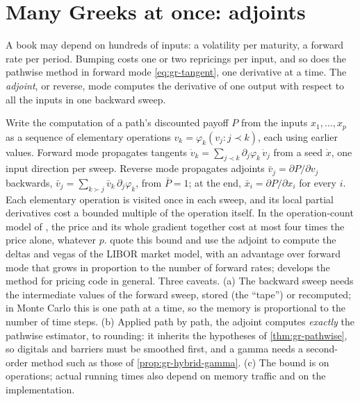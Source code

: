 
\section{Many Greeks at once: adjoints}\label{sec:gr-aad}

A book may depend on hundreds of inputs: a volatility per maturity, a forward rate per period.
Bumping costs one or two repricings per input, and so does the pathwise method in forward mode
\eqref{eq:gr-tangent}, one derivative at a time. The \emph{adjoint}, or reverse, mode computes
the derivative of one output with respect to all the inputs in one backward sweep.

\begin{remark}\label{rem:gr-aad}
Write the computation of a path's discounted payoff $P$ from the inputs $x_1,\dots,x_p$ as a
sequence of elementary operations $v_k=\varphi_k(v_j:j\prec k)$, each using earlier values.
Forward mode propagates tangents $\dot v_k=\sum_{j\prec k}\partial_j\varphi_k\,\dot v_j$ from a
seed $\dot x$, one input direction per sweep. Reverse mode propagates adjoints
$\bar v_j=\partial P/\partial v_j$ backwards, $\bar v_j=\sum_{k\succ j}\bar v_k\,\partial_j\varphi_k$,
from $\bar P=1$; at the end, $\bar x_i=\partial P/\partial x_i$ for every $i$. Each elementary
operation is visited once in each sweep, and its local partial derivatives cost a bounded
multiple of the operation itself. In the operation-count model of
\citet[Section~4.6]{griewank-walther}, the price and its whole gradient together cost at most
four times the price alone, whatever $p$. \textcite{giles-glasserman-adjoints} quote this bound and use the adjoint to compute the
deltas and vegas of the LIBOR market model, with an advantage over forward mode that grows in
proportion to the number of forward rates; \textcite{capriotti-aad} develops the method for
pricing code in general. Three caveats. (a) The backward sweep needs the intermediate values of the forward
sweep, stored (the ``tape'') or recomputed; in Monte Carlo this is one path at a time, so the
memory is proportional to the number of time steps. (b) Applied path by path, the adjoint
computes \emph{exactly} the pathwise estimator, to rounding: it inherits the hypotheses of
\cref{thm:gr-pathwise}, so digitals and barriers must be smoothed first, and a gamma needs a
second-order method such as those of \cref{prop:gr-hybrid-gamma}. (c) The bound is on
operations; actual running times also depend on memory traffic and on the implementation.
\end{remark}

